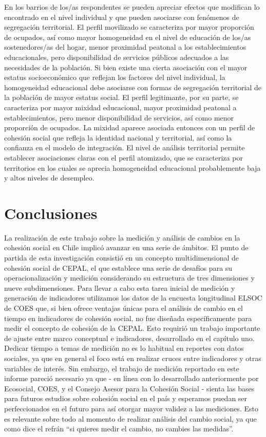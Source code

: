 \documentclass[
  12pt,
]{book}
\begin{document}
En los barrios de los/as respondentes se pueden apreciar efectos que modifican lo encontrado en el nivel individual y que pueden asociarse con fenómenos de segregación territorial. El perfil movilizado se caracteriza por mayor proporción de ocupados, así como mayor homogeneidad en el nivel de educación de los/as sostenedores/as del hogar, menor proximidad peatonal a los establecimientos educacionales, pero disponibilidad de servicios públicos adecuados a las necesidades de la población. Si bien existe una cierta asociación con el mayor estatus socioeconómico que reflejan los factores del nivel individual, la homogeneidad educacional debe asociarse con formas de segregación territorial de la población de mayor estatus social. El perfil legitimante, por su parte, se caracteriza por mayor mixidad educacional, mayor proximidad peatonal a establecimientos, pero menor disponibilidad de servicios, así como menor proporción de ocupados. La mixidad aparece asociada entonces con un perfil de cohesión social que refleja la identidad nacional y territorial, así como la confianza en el modelo de integración. El nivel de análisis territorial permite establecer asociaciones claras con el perfil atomizado, que se caracteriza por territorios en los cuales se aprecia homogeneidad educacional probablemente baja y altos niveles de desempleo.

\hypertarget{conclusiones}{%
\chapter*{Conclusiones}\label{conclusiones}}

La realización de este trabajo sobre la medición y análisis de cambios en la cohesión social en Chile implicó avanzar en una serie de ámbitos. El punto de partida de esta investigación consistió en un concepto multidimensional de cohesión social de CEPAL, el que establece una serie de desafíos para su operacionalización y medición considerando su estructura de tres dimensiones y nueve subdimensiones. Para llevar a cabo esta tarea inicial de medición y generación de indicadores utilizamos los datos de la encuesta longitudinal ELSOC de COES que, si bien ofrece ventajas únicas para el análisis de cambio en el tiempo en indicadores de cohesión social, no fue diseñada específicamente para medir el concepto de cohesión de la CEPAL. Esto requirió un trabajo importante de ajuste entre marco conceptual e indicadores, desarrollado en el capítulo uno. Dedicar tiempo a temas de medición no es lo habitual en reportes con datos sociales, ya que en general el foco está en realizar cruces entre indicadores y otras variables de interés. Sin embargo, el trabajo de medición reportado en este informe pareció necesario ya que - en línea con lo desarrollado anteriormente por Ecosocial, COES, y el Consejo Asesor para la Cohesión Social - sienta las bases para futuros estudios sobre cohesión social en el país y esperamos puedan ser perfeccionados en el futuro para así otorgar mayor validez a las mediciones. Esto es relevante sobre todo al momento de realizar análisis del cambio social, ya que como dice el refrán ``si quieres medir el cambio, no cambies las medidas''.
\end{document}
